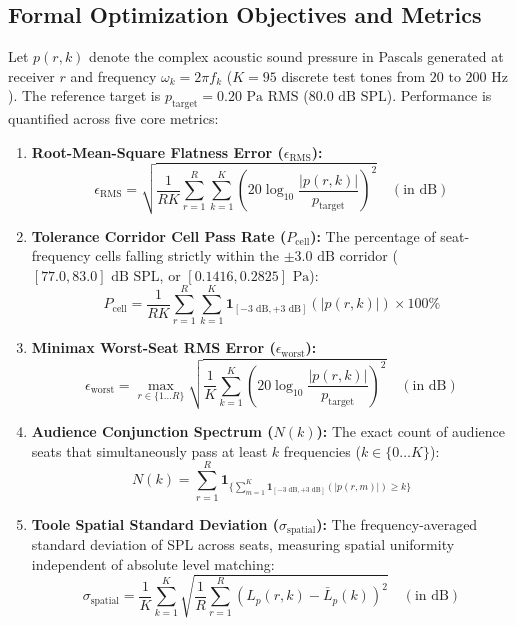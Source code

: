\documentclass[11pt,a4paper,titlepage]{article}
\begin{document}
\subsection{Formal Optimization Objectives and Metrics}
Let $p(r, k)$ denote the complex acoustic sound pressure in Pascals generated at receiver $r$ and frequency $\omega_k = 2 \pi f_k$ ($K = 95$ discrete test tones from $20\text{ to }200\text{ Hz}$). The reference target is $p_{\text{target}} = 0.20\text{ Pa RMS}$ ($80.0\text{ dB SPL}$). Performance is quantified across five core metrics:
\begin{enumerate}
    \item \textbf{Root-Mean-Square Flatness Error ($\epsilon_{\text{RMS}}$):}
    \begin{equation}
        \epsilon_{\text{RMS}} = \sqrt{\frac{1}{R K} \sum_{r=1}^R \sum_{k=1}^K \left( 20 \log_{10} \frac{|p(r, k)|}{p_{\text{target}}} \right)^2} \quad (\text{in dB})
    \end{equation}
    \item \textbf{Tolerance Corridor Cell Pass Rate ($P_{\text{cell}}$):} The percentage of seat-frequency cells falling strictly within the $\pm 3.0\text{ dB}$ corridor ($[77.0, 83.0]\text{ dB SPL}$, or $[0.1416, 0.2825]\text{ Pa}$):
    \begin{equation}
        P_{\text{cell}} = \frac{1}{R K} \sum_{r=1}^R \sum_{k=1}^K \mathbf{1}_{[-3\text{ dB}, +3\text{ dB}]}(|p(r, k)|) \times 100\%
    \end{equation}
    \item \textbf{Minimax Worst-Seat RMS Error ($\epsilon_{\text{worst}}$):}
    \begin{equation}
        \epsilon_{\text{worst}} = \max_{r \in \{1 \dots R\}} \sqrt{\frac{1}{K} \sum_{k=1}^K \left( 20 \log_{10} \frac{|p(r, k)|}{p_{\text{target}}} \right)^2} \quad (\text{in dB})
    \end{equation}
    \item \textbf{Audience Conjunction Spectrum ($N(k)$):} The exact count of audience seats that simultaneously pass at least $k$ frequencies ($k \in \{0 \dots K\}$):
    \begin{equation}
        N(k) = \sum_{r=1}^R \mathbf{1}_{\{ \sum_{m=1}^K \mathbf{1}_{[-3\text{ dB}, +3\text{ dB}]}(|p(r, m)|) \ge k \}}
    \end{equation}
    \item \textbf{Toole Spatial Standard Deviation ($\sigma_{\text{spatial}}$):} The frequency-averaged standard deviation of SPL across seats, measuring spatial uniformity independent of absolute level matching:
    \begin{equation}
        \sigma_{\text{spatial}} = \frac{1}{K} \sum_{k=1}^K \sqrt{\frac{1}{R} \sum_{r=1}^R \left( L_p(r, k) - \bar{L}_p(k) \right)^2} \quad (\text{in dB})
    \end{equation}
\end{enumerate}
\end{document}
